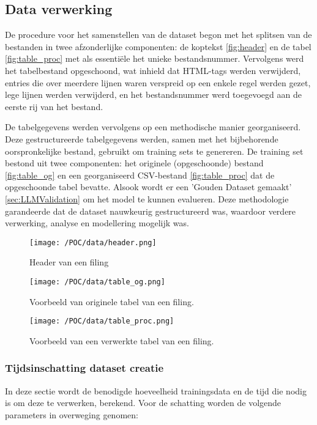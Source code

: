 \subsection{Data verwerking}
De procedure voor het samenstellen van de dataset begon met het splitsen van de bestanden in twee afzonderlijke componenten: de koptekst \autoref{fig:header} en de tabel \autoref{fig:table_proc} met als essentiële het unieke bestandsnummer. Vervolgens werd het tabelbestand opgeschoond, wat inhield dat HTML-tags werden verwijderd, entries die over meerdere lijnen waren verspreid op een enkele regel werden gezet, lege lijnen werden verwijderd, en het bestandsnummer werd toegevoegd aan de eerste rij van het bestand.

De tabelgegevens werden vervolgens op een methodische manier georganiseerd. Deze gestructureerde tabelgegevens werden, samen met het bijbehorende oorspronkelijke bestand, gebruikt om training sets te genereren. De training set bestond uit twee componenten: het originele (opgeschoonde) bestand \autoref{fig:table_og} en een georganiseerd CSV-bestand \autoref{fig:table_proc} dat de opgeschoonde tabel bevatte. Alsook wordt er een 'Gouden Dataset gemaakt' \autoref{sec:LLMValidation} om het model te kunnen evalueren.  Deze methodologie garandeerde dat de dataset nauwkeurig gestructureerd was, waardoor verdere verwerking, analyse en modellering mogelijk was.

  \begin{figure}[H]
    \centering        
    \texttt{[image: /POC/data/header.png]}
    \caption{Header van een filing}
    \label{fig:header}
\end{figure}

\begin{figure}[H]
    \centering        
    \texttt{[image: /POC/data/table\_og.png]}
    \caption{Voorbeeld van originele tabel van een filing.}
    \label{fig:table_og}
\end{figure}
\begin{figure}[H]
    \centering        
    \texttt{[image: /POC/data/table\_proc.png]}
    \caption{Voorbeeld van een verwerkte tabel van een filing.}
    \label{fig:table_proc}
\end{figure}

\subsubsection{Tijdsinschatting dataset creatie}
\label{sec:tijdberekenen}
In deze sectie wordt de benodigde hoeveelheid trainingsdata en de tijd die nodig is om deze te verwerken, berekend. Voor de schatting worden de volgende parameters in overweging genomen:



